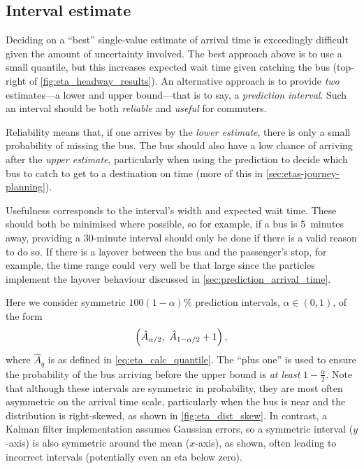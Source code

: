 \subsection{Interval estimate}
\label{sec:etas-interval}


Deciding on a ``best'' single-value estimate of arrival time is exceedingly difficult given the amount of uncertainty involved. The best approach above is to use a small quantile, but this increases expected wait time given catching the bus (top-right of \cref{fig:eta_headway_results}). An alternative approach is to provide \emph{two} estimates---a lower and upper bound---that is to say, a \emph{prediction interval}. Such an interval should be both \emph{reliable} and \emph{useful} for commuters.

Reliability means that, if one arrives by the \emph{lower estimate}, there is only a small probability of missing the bus. The bus should also have a low chance of arriving after the \emph{upper estimate}, particularly when using the prediction to decide which bus to catch to get to a destination on time (more of this in \cref{sec:etas-journey-planning}).

Usefulness corresponds to the interval's width and expected wait time. These should both be minimised where possible, so for example, if a bus is 5~minutes away, providing a 30-minute interval should only be done if there is a valid reason to do so. If there is a layover between the bus and the passenger's stop, for example, the time range could very well be that large since the particles implement the layover behaviour discussed in \cref{sec:prediction_arrival_time}.







Here we consider symmetric $100(1-\alpha)$\% prediction intervals, $\alpha\in (0,1)$, of the form
\begin{equation}
\left(\hat\Teta_{\alpha/2},\ \hat\Teta_{1-\alpha/2}+1\right),
\end{equation}
where $\hat A_q$ is as defined in \cref{eq:eta_calc_quantile}. The ``plus one'' is used to ensure the probability of the bus arriving before the upper bound is \emph{at least} $1-\frac{\alpha}{2}$. Note that although these intervals are symmetric in probability, they are most often asymmetric on the arrival time scale, particularly when the bus is near and the distribution is right-skewed, as shown in \cref{fig:eta_dist_skew}. In contrast, a Kalman filter implementation assumes Gaussian errors, so a symmetric interval ($y$-axis) is also symmetric around the mean ($x$-axis), as shown, often leading to incorrect intervals (potentially even an \gls{eta} below zero).


